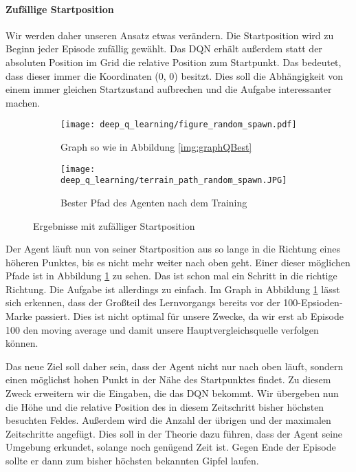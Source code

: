 \paragraph{Zufällige Startposition}
Wir werden daher unseren Ansatz etwas verändern. Die Startposition wird zu Beginn jeder Episode zufällig gewählt. Das DQN erhält außerdem statt der absoluten Position im Grid die relative Position zum Startpunkt. Das bedeutet, dass dieser immer die Koordinaten (0, 0) besitzt. Dies soll die Abhängigkeit von einem immer gleichen Startzustand aufbrechen und die Aufgabe interessanter machen.
\begin{figure}[h!]
    \centering
    \begin{subfigure}[b]{0.49\textwidth}
        \texttt{[image: deep\_q\_learning/figure\_random\_spawn.pdf]}
        \caption{Graph so wie in Abbildung \ref{img:graphQBest}}
        \label{img:graphDeepQRandomSpawn}
    \end{subfigure}
    \begin{subfigure}[b]{0.49\textwidth}
        \texttt{[image: deep\_q\_learning/terrain\_path\_random\_spawn.JPG]}
        \caption{Bester Pfad des Agenten nach dem Training}
        \label{img:pathDeepQRandomSpawn}
    \end{subfigure}
    \caption{Ergebnisse mit zufälliger Startposition}
\end{figure}
Der Agent läuft nun von seiner Startposition aus so lange in die Richtung eines höheren Punktes, bis es nicht mehr weiter nach oben geht. Einer dieser möglichen Pfade ist in Abbildung \ref{img:graphDeepQRandomSpawn} zu sehen. Das ist schon mal ein Schritt in die richtige Richtung. Die Aufgabe ist allerdings zu einfach. Im Graph in Abbildung \ref{img:graphDeepQRandomSpawn} lässt sich erkennen, dass der Großteil des Lernvorgangs bereits vor der 100-Epsioden-Marke passiert. Dies ist nicht optimal für unsere Zwecke, da wir erst ab Episode 100 den moving average und damit unsere Hauptvergleichsquelle verfolgen können.

Das neue Ziel soll daher sein, dass der Agent nicht nur nach oben läuft, sondern einen möglichst hohen Punkt in der Nähe des Startpunktes findet. Zu diesem Zweck erweitern wir die Eingaben, die das DQN bekommt. Wir übergeben nun die Höhe und die relative Position des in diesem Zeitschritt bisher höchsten besuchten Feldes. Außerdem wird die Anzahl der übrigen und der maximalen Zeitschritte angefügt. Dies soll in der Theorie dazu führen, dass der Agent seine Umgebung erkundet, solange noch genügend Zeit ist. Gegen Ende der Episode sollte er dann zum bisher höchsten bekannten Gipfel laufen.

